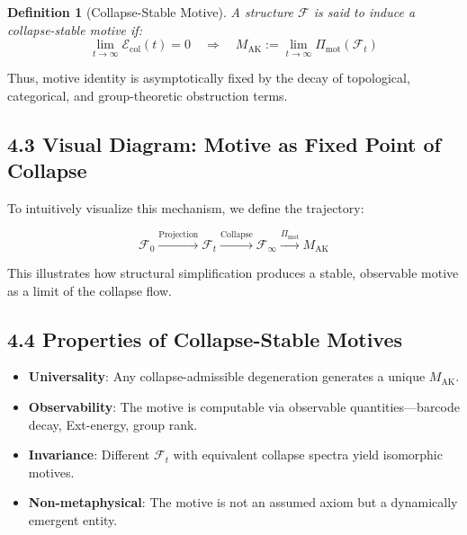 \documentclass[11pt]{article}
\newtheorem{definition}[theorem]{Definition}
\begin{document}
\begin{definition}[Collapse-Stable Motive]
A structure $\mathcal{F}$ is said to induce a \emph{collapse-stable motive} if:
\[
\lim_{t \to \infty} \mathcal{E}_{\mathrm{col}}(t) = 0
\quad \Longrightarrow \quad
M_{\mathrm{AK}} := \lim_{t \to \infty} \Pi_{\mathrm{mot}}(\mathcal{F}_t)
\]
\end{definition}

Thus, motive identity is asymptotically fixed by the decay of topological, categorical, and group-theoretic obstruction terms.

\subsection{4.3 Visual Diagram: Motive as Fixed Point of Collapse}

To intuitively visualize this mechanism, we define the trajectory:

\[
\mathcal{F}_0 \xrightarrow{\text{Projection}} \mathcal{F}_t \xrightarrow{\text{Collapse}} \mathcal{F}_{\infty} \xrightarrow{\Pi_{\mathrm{mot}}} M_{\mathrm{AK}}
\]

\vspace{0.5em}

\begin{center}
\end{center}

This illustrates how structural simplification produces a stable, observable motive as a limit of the collapse flow.

\subsection{4.4 Properties of Collapse-Stable Motives}

\begin{itemize}
    \item \textbf{Universality}: Any collapse-admissible degeneration generates a unique $M_{\mathrm{AK}}$.
    \item \textbf{Observability}: The motive is computable via observable quantities—barcode decay, Ext-energy, group rank.
    \item \textbf{Invariance}: Different $\mathcal{F}_t$ with equivalent collapse spectra yield isomorphic motives.
    \item \textbf{Non-metaphysical}: The motive is not an assumed axiom but a dynamically emergent entity.
\end{itemize}
\end{document}
